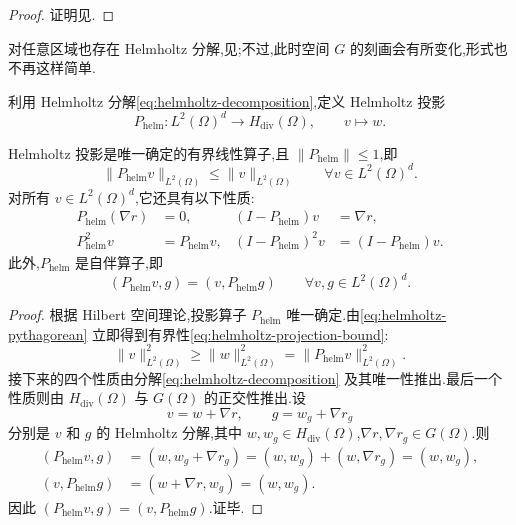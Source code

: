 \begin{proof}
证明见\textcite[第 82 页]{Sohr2001}.
\end{proof}

\begin{note}\label{note:helmholtz-arbitrary-domains}
对任意区域也存在 Helmholtz 分解,见\textcite[引理 2.5.1]{Sohr2001};不过,此时空间 $G$ 的刻画会有所变化,形式也不再这样简单.
\end{note}

\begin{definition}[Helmholtz 投影]\label{def:helmholtz-projection}
利用 Helmholtz 分解\cref{eq:helmholtz-decomposition},定义 Helmholtz 投影
\[
  P_{\mathrm{helm}}:L^2(\Omega)^d\longrightarrow H_{\mathrm{div}}(\Omega),
  \qquad v\longmapsto w.
\]
\end{definition}

\begin{lemma}\label{lem:helmholtz-projection-properties}
Helmholtz 投影是唯一确定的有界线性算子,且 $\|P_{\mathrm{helm}}\|\le1$,即
\begin{equation}\label{eq:helmholtz-projection-bound}
  \|P_{\mathrm{helm}}v\|_{L^2(\Omega)}
    \le\|v\|_{L^2(\Omega)}
    \qquad\forall v\in L^2(\Omega)^d.
\end{equation}
对所有 $v\in L^2(\Omega)^d$,它还具有以下性质:
\[
\begin{aligned}
  P_{\mathrm{helm}}(\nabla r)&=0,
  & (I-P_{\mathrm{helm}})v&=\nabla r,\\
  P_{\mathrm{helm}}^2v&=P_{\mathrm{helm}}v,
  & (I-P_{\mathrm{helm}})^2v&=(I-P_{\mathrm{helm}})v.
\end{aligned}
\]
此外,$P_{\mathrm{helm}}$ 是自伴算子,即
\[
  (P_{\mathrm{helm}}v,g)=(v,P_{\mathrm{helm}}g)
  \qquad\forall v,g\in L^2(\Omega)^d.
\]
\end{lemma}

\begin{proof}
根据 Hilbert 空间理论,投影算子 $P_{\mathrm{helm}}$ 唯一确定.由\cref{eq:helmholtz-pythagorean} 立即得到有界性\cref{eq:helmholtz-projection-bound}:
\[
  \|v\|_{L^2(\Omega)}^2
     \ge\|w\|_{L^2(\Omega)}^2
     =\|P_{\mathrm{helm}}v\|_{L^2(\Omega)}^2.
\]
接下来的四个性质由分解\cref{eq:helmholtz-decomposition} 及其唯一性推出.最后一个性质则由 $H_{\mathrm{div}}(\Omega)$ 与 $G(\Omega)$ 的正交性推出.设
\[
  v=w+\nabla r,\qquad g=w_g+\nabla r_g
\]
分别是 $v$ 和 $g$ 的 Helmholtz 分解,其中 $w,w_g\in H_{\mathrm{div}}(\Omega)$,$\nabla r,\nabla r_g\in G(\Omega)$.则
\[
\begin{aligned}
  (P_{\mathrm{helm}}v,g)
    &=(w,w_g+\nabla r_g)
      =(w,w_g)+(w,\nabla r_g)
      =(w,w_g),\\
  (v,P_{\mathrm{helm}}g)
    &=(w+\nabla r,w_g)
      =(w,w_g).
\end{aligned}
\]
因此 $(P_{\mathrm{helm}}v,g)=(v,P_{\mathrm{helm}}g)$.证毕.
\end{proof}

